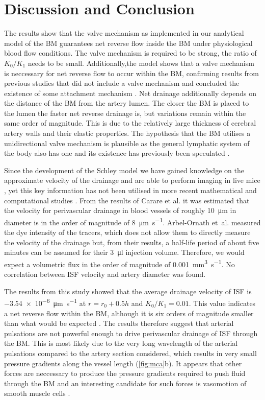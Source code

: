 \documentclass[a4paper,titlepage]{scrartcl}
\begin{document}
\section{Discussion and Conclusion}

The results show that the valve mechanism as implemented in our analytical model of the BM guarantees net reverse flow inside the BM under physiological blood flow conditions. The valve mechanism is required to be strong, \ie the ratio of $K_0/K_1$ needs to be small. Additionally,the model shows that a valve mechanism is neccessary for net reverse flow to occur within the BM, confirming results from previous studies that did not include a valve mechanism and concluded the existence of some attachment mechanism \cite{Schley2006,Wang2011}. Net drainage additionally depends on the distance of the BM from the artery lumen. The closer the BM is placed to the lumen the faster net reverse drainage is, but variations remain within the same order of magnitude. This is due to the relatively large thickness of cerebral artery walls and their elastic properties. The hypothesis that the BM utilises a unidirectional valve mechanism is plausible as the general lymphatic system of the body also has one and its existence has previously been speculated \cite{Weller2010,Schley2006,Heppell2013}.

Since the development of the Schley model we have gained knowledge on the approximate velocity of the drainage and are able to perform imaging in live mice \cite{Carare2008,Schley2006,Arbel-Ornath2013}, yet this key information has not been utilised in more recent mathematical and computational studies \cite{Wang2011,Sharp2015}. From the results of Carare et al. \cite{Carare2008} it was estimated that the velocity for perivascular drainage in blood vessels of roughly \SI{10}{\micro\metre} in diameter is in the order of magnitude of \SI{8}{\micro\metre\per\second}. Arbel-Ornath et~al. \cite{Arbel-Ornath2013} measured the dye intensity of the tracers, which does not allow them to directly measure the velocity of the drainage but, from their results, a half-life period of about five minutes can be assumed for their \SI{3}{\micro\litre} injection volume. Therefore, we would expect a volumetric flux in the order of magnitude of \SI{0.001}{\cubic\milli\metre\per\second}. No correlation between ISF velocity and artery diameter was found.

The results from this study showed that the average drainage velocity of ISF is \SI{-3.54e-6}{\micro\metre\per\second} at $r = r_0 + 0.5h$ and $K_0/K_1 = 0.01$. This value indicates a net reverse flow within the BM, although it is six orders of magnitude smaller than what would be expected \cite{Carare2008}. The results therefore suggest that arterial pulsations are not powerful enough to drive perivascular drainage of ISF through the BM. This is most likely due to the very long wavelength of the arterial pulsations compared to the artery section considered, which results in very small pressure gradients along the vessel length (\autoref{fig:mca}b). It appears that other forces are neccessary to produce the pressure gradients required to push fluid through the BM and an interesting candidate for such forces is vasomotion of smooth muscle cells \cite{DiMarco2015}.
\end{document}
